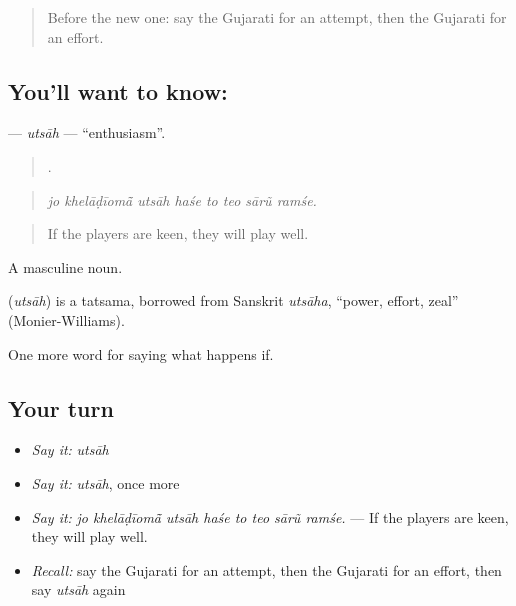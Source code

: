 \label{lesson:GU-C383-utsah}



\begin{quote}
Before the new one: say the Gujarati for an attempt, then the Gujarati for an effort.
\end{quote}

\subsection*{You'll want to know: }
\textbf{} — \emph{utsāh} — \textquotedblleft{}enthusiasm\textquotedblright{}.

\begin{quote}
       .
\end{quote}

\begin{quote}
\emph{jo khelāḍīomā̃ utsāh haśe to teo sārũ ramśe.}
\end{quote}

\begin{quote}
If the players are keen, they will play well.
\end{quote}

A masculine noun.

\begin{cousinweb}
\textbf{} (\emph{utsāh}) is a tatsama, borrowed from Sanskrit \emph{utsāha}, \textquotedblleft{}power, effort, zeal\textquotedblright{} (Monier-Williams).
\end{cousinweb}

\begin{grammarlens}[title={What you've built}]
One more word for saying what happens if.
\end{grammarlens}

\subsection*{Your turn}
\begin{itemize}
\raggedright
  \item \emph{Say it:} \emph{utsāh}
  \item \emph{Say it:} \emph{utsāh}, once more
  \item \emph{Say it:} \emph{jo khelāḍīomā̃ utsāh haśe to teo sārũ ramśe.} — If the players are keen, they will play well.
  \item \emph{Recall:} say the Gujarati for an attempt, then the Gujarati for an effort, then say \emph{utsāh} again
\end{itemize}

